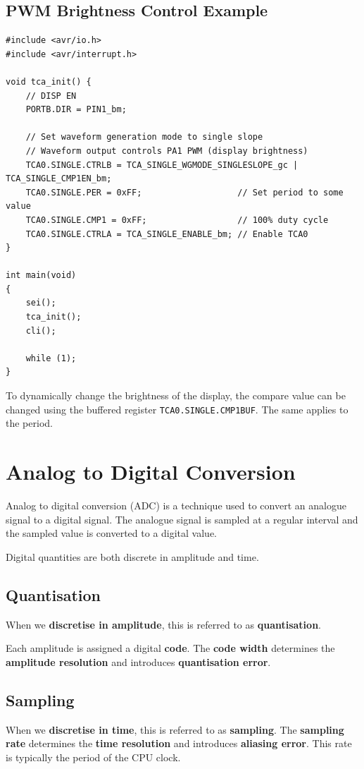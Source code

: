 \documentclass{report}
\begin{document}
\subsection{PWM Brightness Control Example}
\begin{verbatim}
#include <avr/io.h>
#include <avr/interrupt.h>

void tca_init() {
    // DISP EN
    PORTB.DIR = PIN1_bm;

    // Set waveform generation mode to single slope
    // Waveform output controls PA1 PWM (display brightness)
    TCA0.SINGLE.CTRLB = TCA_SINGLE_WGMODE_SINGLESLOPE_gc | TCA_SINGLE_CMP1EN_bm;
    TCA0.SINGLE.PER = 0xFF;                   // Set period to some value
    TCA0.SINGLE.CMP1 = 0xFF;                  // 100% duty cycle
    TCA0.SINGLE.CTRLA = TCA_SINGLE_ENABLE_bm; // Enable TCA0
}

int main(void)
{
    sei();
    tca_init();
    cli();

    while (1);
}
\end{verbatim}
To dynamically change the brightness of the display, the compare value can be changed
using the buffered register \texttt{TCA0.SINGLE.CMP1BUF}. The same applies to the
period.
\section{Analog to Digital Conversion}
Analog to digital conversion (ADC) is a technique used to convert an analogue signal
to a digital signal. The analogue signal is sampled at a regular interval and the
sampled value is converted to a digital value.

Digital quantities are both discrete in amplitude and time.
\subsection{Quantisation}
When we \textbf{discretise in amplitude}, this is referred to as \textbf{quantisation}.

Each amplitude is assigned a digital \textbf{code}. The \textbf{code width}
determines the \textbf{amplitude resolution} and introduces \textbf{quantisation error}.
\subsection{Sampling}
When we \textbf{discretise in time}, this is referred to as \textbf{sampling}.
The \textbf{sampling rate} determines the \textbf{time resolution} and introduces \textbf{aliasing error}.
This rate is typically the period of the CPU clock.
\end{document}
